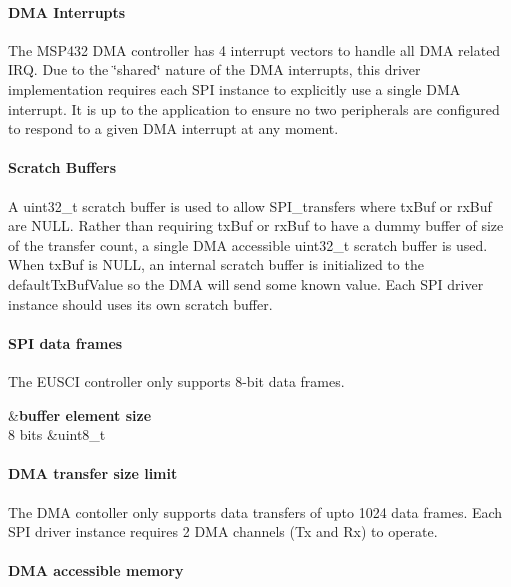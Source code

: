 \paragraph*{D\+M\+A Interrupts}

The M\+S\+P432 D\+M\+A controller has 4 interrupt vectors to handle all D\+M\+A related I\+R\+Q. Due to the \char`\"{}shared\char`\"{} nature of the D\+M\+A interrupts, this driver implementation requires each S\+P\+I instance to explicitly use a single D\+M\+A interrupt. It is up to the application to ensure no two peripherals are configured to respond to a given D\+M\+A interrupt at any moment.

\paragraph*{Scratch Buffers}

A uint32\+\_\+t scratch buffer is used to allow S\+P\+I\+\_\+transfers where tx\+Buf or rx\+Buf are N\+U\+L\+L. Rather than requiring tx\+Buf or rx\+Buf to have a dummy buffer of size of the transfer count, a single D\+M\+A accessible uint32\+\_\+t scratch buffer is used. When tx\+Buf is N\+U\+L\+L, an internal scratch buffer is initialized to the default\+Tx\+Buf\+Value so the D\+M\+A will send some known value. Each S\+P\+I driver instance should uses its own scratch buffer.

\paragraph*{S\+P\+I data frames}

The E\+U\+S\+C\+I controller only supports 8-\/bit data frames.

\begin{TabularC}{2}
\hline
{}&{\bf buffer element size  }\\
8 bits &uint8\+\_\+t \\
\end{TabularC}
\paragraph*{D\+M\+A transfer size limit}

The D\+M\+A contoller only supports data transfers of upto 1024 data frames. Each S\+P\+I driver instance requires 2 D\+M\+A channels (Tx and Rx) to operate.

\paragraph*{D\+M\+A accessible memory}


